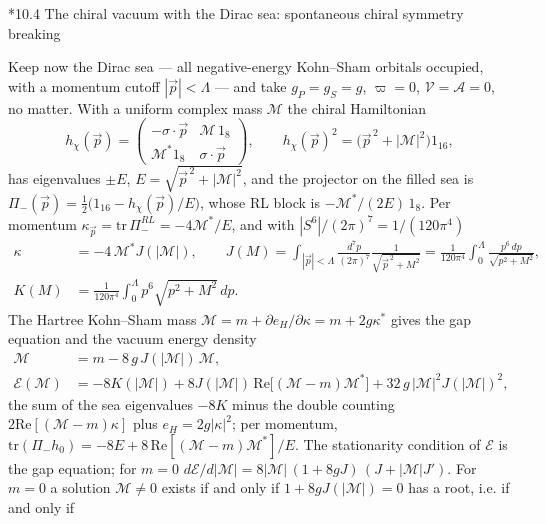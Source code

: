 \documentclass[10pt,a4paper]{article}
\makeatletter
\renewcommand\subsection{\@startsection{subsection}{2}{\z@}{-3.25ex\@plus -1ex \@minus -.2ex}{1.5ex \@plus .2ex}{\normalfont\large\bfseries\raggedright}}
\makeatother
\begin{document}
\subsection*{10.4 The chiral vacuum with the Dirac sea: spontaneous chiral symmetry breaking}
Keep now the Dirac sea — all negative-energy Kohn–Sham orbitals occupied, with a momentum cutoff $|\vec p|<\Lambda$ — and take $g_P=g_S=g$, $\varpi=0$, $\mathcal V=\mathcal A=0$, no matter. With a uniform complex mass $\mathcal M$ the chiral Hamiltonian
\begin{equation*}
h_\chi(\vec p)=\begin{pmatrix}-\sigma\cdot\vec p&\mathcal M\,1_8\\ \mathcal M^*1_8&\sigma\cdot\vec p\end{pmatrix},\qquad h_\chi(\vec p)^2=\big(\vec p^{\,2}+|\mathcal M|^2\big)1_{16},
\end{equation*}
has eigenvalues $\pm E$, $E=\sqrt{\vec p^{\,2}+|\mathcal M|^2}$, and the projector on the filled sea is $\Pi_-(\vec p)=\tfrac12\big(1_{16}-h_\chi(\vec p)/E\big)$, whose RL block is $-\mathcal M^*/(2E)\,1_8$. Per momentum $\kappa_{\vec p}=\mathrm{tr}\,\Pi_-^{RL}=-4\mathcal M^*/E$, and with $|S^6|/(2\pi)^7=1/(120\pi^4)$
\begin{align*}
\kappa&=-4\,\mathcal M^*J(|\mathcal M|),\qquad J(M)=\int_{|\vec p|<\Lambda}\frac{d^7p}{(2\pi)^7}\frac{1}{\sqrt{\vec p^{\,2}+M^2}}=\frac{1}{120\pi^4}\int_0^\Lambda\frac{p^6\,dp}{\sqrt{p^2+M^2}}, \\
K(M)&=\frac{1}{120\pi^4}\int_0^\Lambda p^6\sqrt{p^2+M^2}\,dp .
\end{align*}
The Hartree Kohn–Sham mass $\mathcal M=m+\partial e_H/\partial\kappa=m+2g\kappa^*$ gives the gap equation and the vacuum energy density
\begin{align*}
\mathcal M&=m-8\,g\,J(|\mathcal M|)\,\mathcal M, \\
\mathcal E(\mathcal M)&=-8K(|\mathcal M|)+8J(|\mathcal M|)\,\mathrm{Re}\big[(\mathcal M-m)\mathcal M^*\big]+32\,g\,|\mathcal M|^2J(|\mathcal M|)^2,
\end{align*}
the sum of the sea eigenvalues $-8K$ minus the double counting $2\mathrm{Re}[(\mathcal M-m)\kappa]$ plus $e_H=2g|\kappa|^2$; per momentum, $\mathrm{tr}(\Pi_-h_0)=-8E+8\,\mathrm{Re}[(\mathcal M-m)\mathcal M^*]/E$. The stationarity condition of $\mathcal E$ is the gap equation; for $m=0$ $d\mathcal E/d|\mathcal M|=8|\mathcal M|\,(1+8gJ)\,(J+|\mathcal M|J')$. For $m=0$ a solution $\mathcal M\neq0$ exists if and only if $1+8gJ(|\mathcal M|)=0$ has a root, i.e. if and only if
\end{document}
